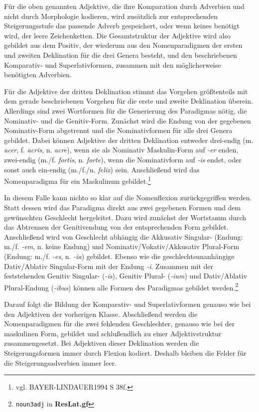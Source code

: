 \documentclass[12pt,abstract=on]{scrreprt}
\begin{document}
Für die oben genannten Adjektive, die ihre Komparation durch Adverbien und nicht durch Morphologie kodieren, wird zusätzlich zur entsprechenden Steigerungsstufe das passende Adverb gespeichert, oder wenn keines benötigt wird, der leere Zeichenketten. Die Gesamtstruktur der Adjektive wird also gebildet aus dem Positiv, der wiederum aus den Nomenparadigmen der ersten und zweiten Deklination für die drei Genera besteht, und den beschriebenen Komparativ- und Superlativformen, zusammen mit den möglicherweise benötigten Adverbien.\par
Für die Adjektive der dritten Deklination stimmt das Vorgehen größtenteils mit dem gerade beschriebenen Vorgehen für die erste und zweite Deklination überein. Allerdings sind zwei Wortformen für die Generierung des Paradigmas nötig, die Nominativ- und die Genitiv-Form. Zunächst wird die Endung von der gegebenen Nominativ-Form abgetrennt und die Nominativformen für alle drei Genera gebildet. Dabei können Adjektive der dritten Deklination entweder drei-endig (m. \textit{acer}, f. \textit{acris}, n. \textit{acre}), wenn sie als Nominativ Maskulin-Form auf \textit{-er} enden, zwei-endig (m./f. \textit{fortis}, n. \textit{forte}), wenn die Nominativform auf \textit{-is} endet, oder sonst auch ein-endig (m./f./n. \textit{felix}) sein. Anschließend wird das Nomenparadigma für ein Maskulinum gebildet.\footnote{vgl. BAYER-LINDAUER1994 S 38f.} \par
In diesem Falle kann nichto so klar auf die Nomenflexion zurückgegriffen werden. Statt dessen wird das Paradigma direkt aus zwei gegebenen Formen und dem gewünschten Geschlecht hergeleitet. Dazu wird zunächst der Wortstamm durch das Abtrennen der Genitivendung von der entsprechenden Form gebildet. Anschließend wird von Geschlecht abhängig die Akkusativ Singular- (Endung: m./f. \textit{-em}, n. keine Endung) und Nominativ/Vokativ/Akkusativ Plural-Form (Endung: m./f. \textit{-es}, n. \textit{-ia}) gebildet. Ebenso wie die geschlechtsunanhängige Dativ/Ablativ Singular-Form mit der Endung \textit{-i}. Zusammen mit der feststehenden Genitiv Singular- (\textit{-is}), Genitiv Plural- (\textit{-ium}) und Dativ/Ablativ Plural-Endung (\textit{-ibus}) können alle Formen des Paradigmas gebildet werden.\footnote{\texttt{noun3adj} in \textbf{ResLat.gf}} \par
Darauf folgt die Bildung der Komparativ- und Superlativformen genauso wie bei den Adjektiven der vorherigen Klasse. Abschließend werden die Nomenparadigmen für die zwei fehlenden Geschlechter, genauso wie bei der maskulinen Form, gebildet und schlußendlich zu einer Adjektivstruktur zusammengesetzt. Bei Adjektiven dieser Deklination werden die Steigerungsformen immer durch Flexion kodiert. Deshalb bleiben die Felder für die Steigerungsadverbien immer leer.
\end{document}
